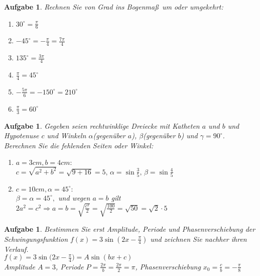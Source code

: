 \documentclass[12pt]{article}
\newtheorem{exercise}[satz]{Aufgabe}
\begin{document}
\vspace{0.1cm}

\begin{exercise}
  Rechnen Sie von Grad ins Bogenma\ss \, um oder umgekehrt:
  \begin{multicols}{2}
    \begin{enumerate}
    \item[(a)] $30^\circ = \frac{\pi}{6}$
    \item[(b)] $-45^\circ = -\frac{\pi}{4} = \frac{7\pi}{4}$
    \item[(c)] $135^\circ =\frac{3\pi}{4}$
    \item[(d)] $\frac{\pi}{4} = 45^\circ$
    \item[(e)] $-\frac{5\pi}{6} = -150^\circ = 210^\circ$
    \item[(f)] $\frac{\pi}{3} = 60^\circ$
    \end{enumerate}
  \end{multicols}
\end{exercise}

\vspace{0.1cm}

\begin{exercise}
  Gegeben seien rechtwinklige Dreiecke mit Katheten $a$ und $b$ und Hypotenuse $c$ und Winkeln $\alpha$(gegen\"uber $a$), $\beta$(gegen\"uber $b$) und $\gamma = 90^\circ$. Berechnen Sie die fehlenden Seiten oder Winkel:
  \begin{enumerate}
    \item[(a)] $a = 3cm, b = 4cm:$\\
    $c=\sqrt{a^2+b^2} = \sqrt{9+16} = 5, \,\alpha = \sin{\frac{3}{5}}, \,\beta = \sin{\frac{4}{5}}$
    \item[(b)] $c = 10cm, \alpha = 45^\circ:$\\
    $\beta = \alpha = 45^\circ,$ und wegen $a = b $ gilt $2a^2 = c^2 \Rightarrow a = b = \sqrt{\frac{c^2}{2}} = \sqrt{\frac{100}{2}} = \sqrt{50} = \sqrt{2} \cdot 5$ 
  \end{enumerate}
\end{exercise}

\vspace{0.1cm}

\begin{exercise}
  Bestimmen Sie erst Amplitude, Periode und Phasenverschiebung der Schwingungsfunktion $f(x) = 3 \sin{(2x-\frac{\pi}{4})}$ und zeichnen Sie nachher ihren Verlauf.\\
  $f(x) = 3 \sin{(2x-\frac{\pi}{4}})= A \sin{(bx+c)}$\\
  Amplitude $A=3$, Periode $P = \frac{2\pi}{b} = \frac{2\pi}{2} = \pi$, Phasenverschiebung $x_0 = \frac{c}{b} = -\frac{\pi}{8}$
\end{exercise}
\end{document}

